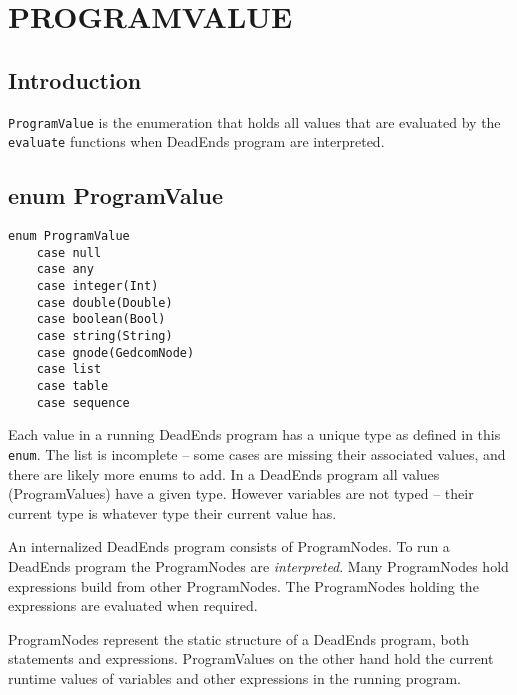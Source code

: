 \section{PROGRAMVALUE}

\subsection{Introduction}
\texttt{ProgramValue} is the enumeration that holds all values that are
evaluated by the \texttt{evaluate} functions when DeadEnds program are
interpreted.

\subsection{enum ProgramValue}
\begin{verbatim}
enum ProgramValue
    case null
    case any
    case integer(Int)
    case double(Double)
    case boolean(Bool)
    case string(String)
    case gnode(GedcomNode)
    case list
    case table
    case sequence
\end{verbatim}

Each value in a running DeadEnds program has a unique type
as defined in this \texttt{enum}.
The list is incomplete -- some cases are missing their
associated values, and there are likely more enums to add.
In a DeadEnds program all values (ProgramValues) have a given
type. However variables are not typed -- their current type is
whatever type their current value has.

An internalized DeadEnds program consists of ProgramNodes. To run a
DeadEnds program the ProgramNodes are \emph{interpreted}.
Many ProgramNodes hold expressions build from other ProgramNodes.
The ProgramNodes holding the expressions are evaluated when required.

ProgramNodes represent the static structure of a DeadEnds program,
both statements and expressions. ProgramValues on the other hand
hold the current runtime values of variables and other expressions
in the running program.

